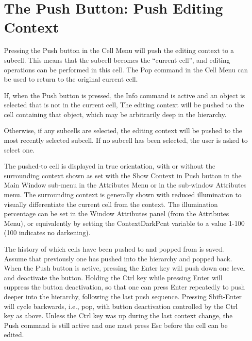 \section{The {\cb Push} Button: Push Editing Context}
\label{pushcmd}
Pressing the {\cb Push} button in the {\cb Cell Menu} will push the
editing context to a subcell.  This means that the subcell becomes the
``current cell'', and editing operations can be performed in this
cell.  The {\cb Pop} command in the {\cb Cell Menu} can be used to
return to the original current cell.

If, when the {\cb Push} button is pressed, the {\cb Info} command is
active and an object is selected that is not in the current cell, The
editing context will be pushed to the cell containing that object,
which may be arbitrarily deep in the hierarchy.

Otherwise, if any subcells are selected, the editing context will be
pushed to the most recently selected subcell.  If no subcell has been
selected, the user is asked to select one.

The pushed-to cell is displayed in true orientation, with or without
the surrounding context shown as set with the {\cb Show Context in
Push} button in the {\cb Main Window} sub-menu in the {\cb Attributes
Menu} or in the sub-window {\cb Attributes} menu.  The surrounding
context is generally shown with reduced illumination to visually
differentiate the current cell from the context.  The illumination
percentage can be set in the {\cb Window Attributes} panel (from the
{\cb Attributes Menu}), or equivalently by setting the {\et
ContextDarkPcnt} variable to a value 1-100 (100 indicates no
darkening).

The history of which cells have been pushed to and popped from is
saved.  Assume that previously one has pushed into the hierarchy and
popped back.  When the {\cb Push} button is active, pressing the {\kb
Enter} key will push down one level and deactivate the button. 
Holding the {\kb Ctrl} key while pressing {\kb Enter} will suppress
the button deactivation, so that one can press {\kb Enter} repeatedly
to push deeper into the hierarchy, following the last push sequence. 
Pressing {\kb Shift-Enter} will cycle backwards, i.e., pop, with
button deactivation controlled by the {\kb Ctrl} key as above.  Unless
the {\kb Ctrl} key was up during the last context change, the
{\cb Push} command is still active and one must press {\kb Esc}
before the cell can be edited.

